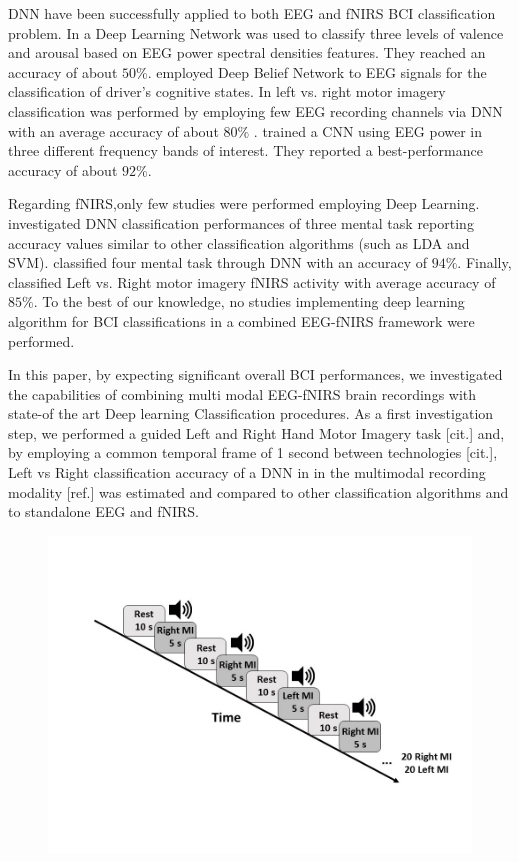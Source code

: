 \documentclass[12pt ]{iopart}
\begin{document}
DNN have been successfully applied to  both EEG and fNIRS BCI classification problem. In \textcite{jirayucharoensak2014eeg} a Deep Learning Network was used to classify three levels of valence and arousal based on EEG power spectral densities  features. They reached an accuracy of about $50\%$. 
\textcite{hajinoroozi2015feature} employed Deep Belief Network to EEG signals for the classification of driver's cognitive states. 
In \textcite{an2014deep} left vs. right motor imagery classification  was performed by employing few EEG recording channels via DNN with an average accuracy of about $80\%$ . 
 \textcite{bashivan2015learning} trained a CNN using EEG power in three different frequency bands of interest. They reported a best-performance accuracy of about $92\%$.

Regarding fNIRS,only  few  studies were performed employing Deep Learning.  \textcite{hennrich2015investigating} investigated DNN classification performances of three mental task reporting accuracy values similar  to other classification algorithms (such as LDA and SVM).  \textcite{abibullaev2011neural} classified four mental task through DNN with an accuracy of $94\%$. Finally, \textcite{nguyen2013temporal} classified Left vs. Right motor imagery fNIRS activity with average accuracy of $85\%$. To the best of our knowledge, no studies implementing deep learning algorithm for BCI classifications  in a combined EEG-fNIRS framework were performed.

 In this paper, by expecting significant overall BCI performances,  we investigated the capabilities of combining multi modal EEG-fNIRS brain recordings  with state-of the art Deep learning Classification procedures. As a first investigation step, we performed a guided Left and Right Hand Motor Imagery task [cit.] and, by employing a common temporal frame of 1 second between technologies [cit.], Left vs Right classification accuracy of a DNN in in the multimodal recording modality  [ref.] was estimated and compared to other classification algorithms and to standalone EEG and fNIRS. 

\begin{figure}
	\includegraphics[width=\linewidth]{Slide1.JPG}
	\caption{}
	\label{fig:fig1}
\end{figure}
\end{document}
